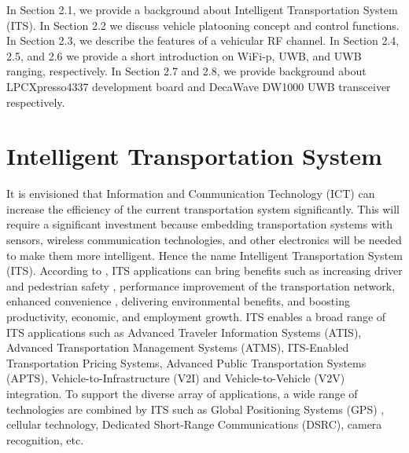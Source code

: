 


In Section 2.1, we provide a background about Intelligent Transportation System (ITS). In Section 2.2 we discuss vehicle platooning concept and control functions. In Section 2.3, we describe the features of a vehicular RF channel. In Section 2.4, 2.5, and 2.6 we provide a short introduction on WiFi-p, UWB, and UWB ranging, respectively. In Section 2.7 and 2.8, we provide background about LPCXpresso4337 development board and DecaWave DW1000 UWB transceiver respectively. 

\section{Intelligent Transportation System}
It is envisioned that Information and Communication Technology (ICT) can increase the efficiency of the current transportation system significantly. This will require a significant investment because embedding transportation systems with sensors, wireless communication technologies, and other electronics will be needed to make them more intelligent. Hence the name Intelligent Transportation System (ITS). According to \cite{ezell2010explaining}, ITS applications can bring benefits such as increasing driver and pedestrian safety \cite{facts2008data}, performance improvement of the transportation network, enhanced convenience \cite{drane1998positioning}, delivering environmental benefits, and boosting productivity, economic, and employment growth. ITS enables a broad range of ITS applications such as Advanced Traveler Information Systems (ATIS), Advanced Transportation Management Systems (ATMS), ITS-Enabled Transportation Pricing Systems, Advanced Public Transportation Systems (APTS), Vehicle-to-Infrastructure (V2I) and Vehicle-to-Vehicle (V2V) integration. To support the diverse array of applications, a wide range of technologies are combined by ITS such as Global Positioning Systems (GPS) \cite{el2002introduction}, cellular technology, Dedicated Short-Range Communications (DSRC), camera recognition, etc.

